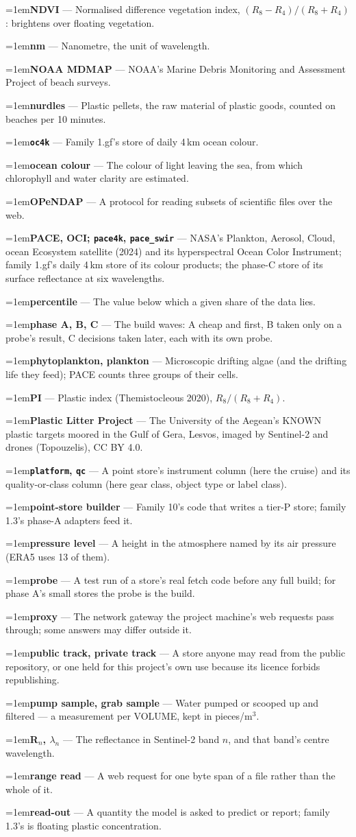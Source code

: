 \documentclass[10pt]{article}
\newcommand{\code}[1]{\texttt{#1}}
\newcommand{\gl}[2]{\par\hangindent=1em\hangafter=1\textbf{#1} --- #2\par}
\begin{document}
\gl{NDVI}{Normalised difference vegetation index, $(R_8 - R_4)/(R_8 + R_4)$: brightens over floating vegetation.}
\gl{nm}{Nanometre, the unit of wavelength.}
\gl{NOAA MDMAP}{NOAA's Marine Debris Monitoring and Assessment Project of beach surveys.}
\gl{nurdles}{Plastic pellets, the raw material of plastic goods, counted on beaches per 10 minutes.}
\gl{\code{oc4k}}{Family 1.gf's store of daily 4\,km ocean colour.}
\gl{ocean colour}{The colour of light leaving the sea, from which chlorophyll and water clarity are estimated.}
\gl{OPeNDAP}{A protocol for reading subsets of scientific files over the web.}
\gl{PACE, OCI; \code{pace4k}, \code{pace\_swir}}{NASA's Plankton, Aerosol, Cloud, ocean Ecosystem satellite (2024) and its hyperspectral Ocean Color Instrument; family 1.gf's daily 4\,km store of its colour products; the phase-C store of its surface reflectance at six wavelengths.}
\gl{percentile}{The value below which a given share of the data lies.}
\gl{phase A, B, C}{The build waves: A cheap and first, B taken only on a probe's result, C decisions taken later, each with its own probe.}
\gl{phytoplankton, plankton}{Microscopic drifting algae (and the drifting life they feed); PACE counts three groups of their cells.}
\gl{PI}{Plastic index (Themistocleous 2020), $R_8/(R_8 + R_4)$.}
\gl{Plastic Litter Project}{The University of the Aegean's KNOWN plastic targets moored in the Gulf of Gera, Lesvos, imaged by Sentinel-2 and drones (Topouzelis), CC BY 4.0.}
\gl{\code{platform}, \code{qc}}{A point store's instrument column (here the cruise) and its quality-or-class column (here gear class, object type or label class).}
\gl{point-store builder}{Family 10's code that writes a tier-P store; family 1.3's phase-A adapters feed it.}
\gl{pressure level}{A height in the atmosphere named by its air pressure (ERA5 uses 13 of them).}
\gl{probe}{A test run of a store's real fetch code before any full build; for phase A's small stores the probe is the build.}
\gl{proxy}{The network gateway the project machine's web requests pass through; some answers may differ outside it.}
\gl{public track, private track}{A store anyone may read from the public repository, or one held for this project's own use because its licence forbids republishing.}
\gl{pump sample, grab sample}{Water pumped or scooped up and filtered --- a measurement per VOLUME, kept in pieces/m$^3$.}
\gl{R$_n$, $\lambda_n$}{The reflectance in Sentinel-2 band $n$, and that band's centre wavelength.}
\gl{range read}{A web request for one byte span of a file rather than the whole of it.}
\gl{read-out}{A quantity the model is asked to predict or report; family 1.3's is floating plastic concentration.}
\end{document}
